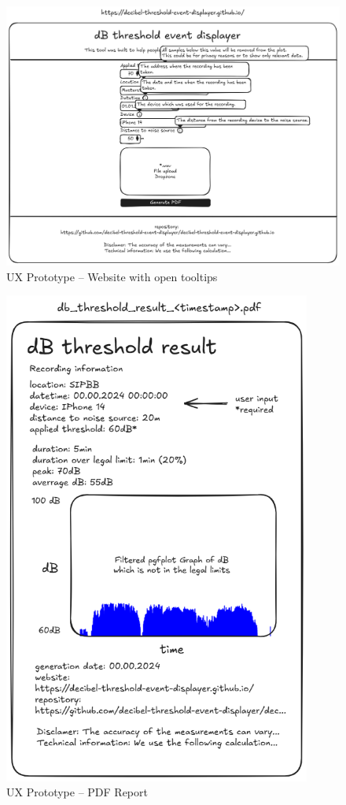 \begin{figure}[H]
    \centering
    \includegraphics[width=1\textwidth]{../assets/ux_prototype_website_tooltips.png}
    \caption{UX Prototype – Website with open tooltips}\label{fig:ux_prototype_website_tooltips}
\end{figure}

\begin{figure}[H]
    \centering
    \includegraphics[width=0.9\textwidth]{../assets/ux_prototype.png}
    \caption{UX Prototype – PDF Report}\label{fig:ux_prototype_pdf_report}
\end{figure}

